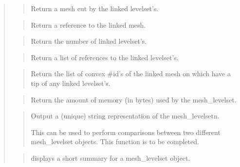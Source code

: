 \documentclass[a4paper,11pt,english]{sphinxmanual}
\begin{document}
\begin{quote}

\begin{quote}

Return a mesh cut by the linked levelset’s.
\end{quote}

\begin{quote}

Return a reference to the linked mesh.
\end{quote}

\begin{quote}

Return the number of linked levelset’s.
\end{quote}

\begin{quote}

Return a list of references to the linked levelset’s.
\end{quote}

\begin{quote}

Return the list of convex \#id’s of the linked mesh on
which have a tip of any linked levelset’s.
\end{quote}

\begin{quote}

Return the amount of memory (in bytes) used by the mesh\_levelset.
\end{quote}

\begin{quote}

Output a (unique) string representation of the mesh\_levelsetn.

This can be used to perform comparisons between two
different mesh\_levelset objects.
This function is to be completed.
\end{quote}

\begin{quote}

displays a short summary for a mesh\_levelset object.
\end{quote}
\end{quote}
\end{document}
